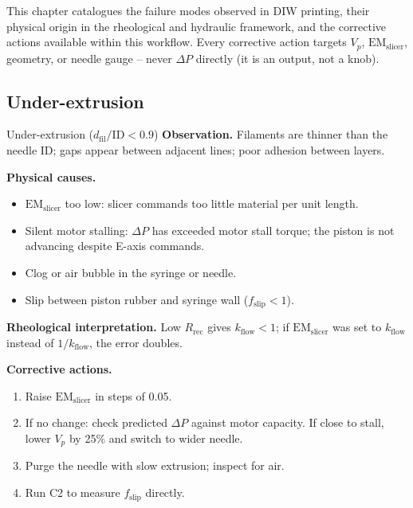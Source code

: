 \documentclass[11pt,a4paper]{article}
\begin{document}
This chapter catalogues the failure modes observed in DIW printing,
their physical origin in the rheological and hydraulic framework, and
the corrective actions available within this workflow. Every corrective
action targets $V_p$, $\mathrm{EM}_\mathrm{slicer}$, geometry, or
needle gauge -- never $\Delta P$ directly (it is an output, not a knob).

\subsection{Under-extrusion}

\begin{failurebox}{Under-extrusion ($d_\mathrm{fil}/\mathrm{ID}<0.9$)}
\textbf{Observation.} Filaments are thinner than the needle ID;
gaps appear between adjacent lines; poor adhesion between layers.

\textbf{Physical causes.}
\begin{itemize}[leftmargin=1.4em,itemsep=2pt]
\item $\mathrm{EM}_\mathrm{slicer}$ too low: slicer commands too little
  material per unit length.
\item Silent motor stalling: $\Delta P$ has exceeded motor stall torque;
  the piston is not advancing despite E-axis commands.
\item Clog or air bubble in the syringe or needle.
\item Slip between piston rubber and syringe wall ($f_\mathrm{slip}<1$).
\end{itemize}

\textbf{Rheological interpretation.} Low $R_\mathrm{rec}$ gives
$k_\mathrm{flow}<1$; if $\mathrm{EM}_\mathrm{slicer}$ was set to
$k_\mathrm{flow}$ instead of $1/k_\mathrm{flow}$, the error doubles.

\textbf{Corrective actions.}
\begin{enumerate}[leftmargin=1.6em,itemsep=1pt]
\item Raise $\mathrm{EM}_\mathrm{slicer}$ in steps of 0.05.
\item If no change: check predicted $\Delta P$ against motor capacity.
  If close to stall, lower $V_p$ by 25\% and switch to wider needle.
\item Purge the needle with slow extrusion; inspect for air.
\item Run C2 to measure $f_\mathrm{slip}$ directly.
\end{enumerate}
\end{failurebox}
\end{document}
